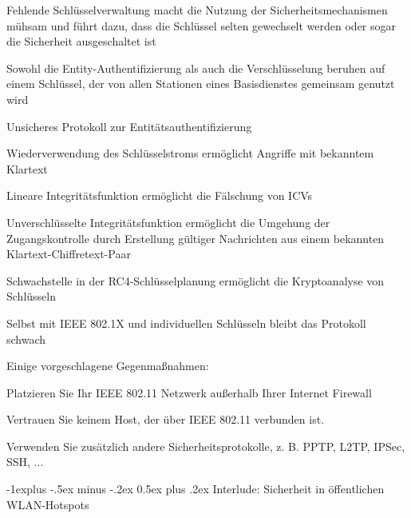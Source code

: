 \documentclass[a4paper]{article}
\makeatletter
\renewcommand{\subsection}{\@startsection{subsection}{2}{0mm}%
 {-1explus -.5ex minus -.2ex}%
 {0.5ex plus .2ex}%
 {\normalfont\normalsize\bfseries}}
\makeatother
\begin{document}
\begin{multicols}{3}
\begin{itemize*}
            \begin{itemize*}
                  \item Fehlende Schlüsselverwaltung macht die Nutzung der Sicherheitsmechanismen mühsam und führt dazu, dass die Schlüssel selten gewechselt werden oder sogar die Sicherheit ausgeschaltet ist
                  \item Sowohl die Entity-Authentifizierung als auch die Verschlüsselung beruhen auf einem Schlüssel, der von allen Stationen eines Basisdienstes gemeinsam genutzt wird
                  \item Unsicheres Protokoll zur Entitätsauthentifizierung
                  \item Wiederverwendung des Schlüsselstroms ermöglicht Angriffe mit bekanntem Klartext
                  \item Lineare Integritätsfunktion ermöglicht die Fälschung von ICVs
                  \item Unverschlüsselte Integritätsfunktion ermöglicht die Umgehung der Zugangskontrolle durch Erstellung gültiger Nachrichten aus einem bekannten Klartext-Chiffretext-Paar
                  \item Schwachstelle in der RC4-Schlüsselplanung ermöglicht die Kryptoanalyse von Schlüsseln
            \end{itemize*}
            \item
            Selbst mit IEEE 802.1X und individuellen Schlüsseln bleibt das
            Protokoll schwach
            \item
            Einige vorgeschlagene Gegenmaßnahmen:

            \begin{itemize*}
                  \item Platzieren Sie Ihr IEEE 802.11 Netzwerk außerhalb Ihrer Internet Firewall
                  \item Vertrauen Sie keinem Host, der über IEEE 802.11 verbunden ist.
                  \item Verwenden Sie zusätzlich andere Sicherheitsprotokolle, z. B. PPTP, L2TP, IPSec, SSH, ...
            \end{itemize*}
      \end{itemize*}


      \subsection{Interlude: Sicherheit in öffentlichen
            WLAN-Hotspots}


\end{multicols}
\end{document}
